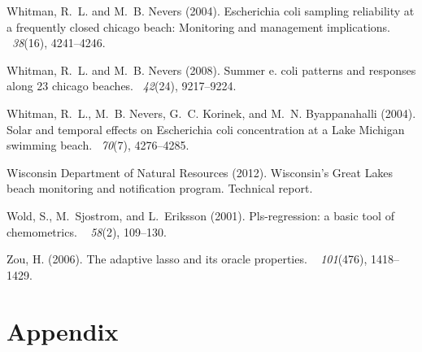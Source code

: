 \documentclass[authoryear,review, 12pt]{elsarticle}
\begin{document}
\begin{thebibliography}{}
Whitman, R.~L. and M.~B. Nevers (2004).
\newblock Escherichia coli sampling reliability at a frequently closed chicago
  beach: Monitoring and management implications.
~{\em 38\/}(16),
  4241--4246.

Whitman, R.~L. and M.~B. Nevers (2008).
\newblock Summer e. coli patterns and responses along 23 chicago beaches.
~{\em 42\/}(24),
  9217--9224.

Whitman, R.~L., M.~B. Nevers, G.~C. Korinek, and M.~N. Byappanahalli (2004).
\newblock Solar and temporal effects on {E}scherichia coli concentration at a
  {Lake Michigan} swimming beach.
~{\em 70\/}(7),
  4276--4285.

{Wisconsin Department of Natural Resources} (2012).
\newblock Wisconsin's {G}reat {L}akes beach monitoring and notification
  program.
\newblock Technical report.

Wold, S., M.~Sjostrom, and L.~Eriksson (2001).
\newblock Pls-regression: a basic tool of chemometrics.
~{\em
  58\/}(2), 109--130.

Zou, H. (2006).
\newblock The adaptive lasso and its oracle properties.
~{\em
  101\/}(476), 1418--1429.

\end{thebibliography}
\clearpage

\section{Appendix}\label{appendix}
\end{document}
